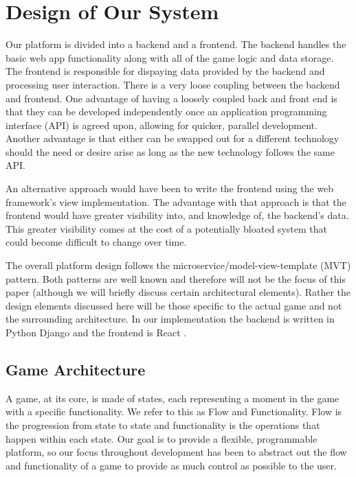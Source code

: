 \documentclass{article}
\begin{document}
\section{Design of Our System}
    Our platform is divided into a backend and a frontend. The backend handles the basic web app functionality along with all of the game logic and data storage. The frontend is responsible for dispaying data provided by the backend and processing user interaction. There is a very loose coupling between the backend and frontend. One advantage of having a loosely coupled back and front end is that they can be developed independently once an application programming interface (API) is agreed upon, allowing for quicker, parallel development. Another advantage is that either can be swapped out for a different technology should the need or desire arise as long as the new technology follows the same API.
    \smallskip
    
    An alternative approach would have been to write the frontend using the web framework's view implementation. The advantage with that approach is that the frontend would have greater visibility into, and knowledge of, the backend's data. This greater visibility comes at the cost of a potentially bloated system that could become difficult to change over time.
    \smallskip
    
    The overall platform design follows the microservice/model-view-template (MVT) pattern. Both patterns are well known and therefore will not be the focus of this paper (although we will briefly discuss certain architectural elements). Rather the design elements discussed here will be those specific to the actual game and not the surrounding architecture. In our implementation the backend is written in Python Django \cite{django} and the frontend is React \cite{react}.

	\subsection{Game Architecture}\label{architecture}
	    A game, at its core, is made of states, each representing a moment in the game with a specific functionality. We refer to this as Flow and Functionality. Flow is the progression from state to state and functionality is the operations that happen within each state. Our goal is to provide a flexible, programmable platform, so our focus throughout development has been to abstract out the flow and functionality of a game to provide as much control as possible to the user.
\end{document}
